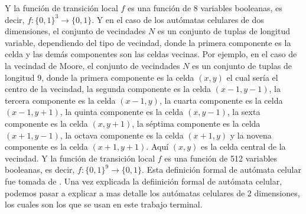         Y la funci\'on de transici\'on local $f$ es una funci\'on de 8 variables booleanas, es decir, $f: \{0,1\}^3 \rightarrow \{0,1\}$.
    \vskip 0.5cm    
    Y en el caso de los aut\'omatas celulares de dos dimensiones, el conjunto de vecindades $N$ es un conjunto de tuplas de longitud variable, 
        dependiendo del tipo de vecindad, donde la primera componente es la celda y las dem\'as componentes son las celdas vecinas. Por ejemplo, 
        en el caso de la vecindad de Moore, el conjunto de vecindades $N$ es un conjunto de tuplas de longitud 9, donde la primera componente es la celda
        $(x,y)$ el cual ser\'ia el centro de la vecindad, la segunda componente es la celda $(x-1,y-1)$, la tercera componente es la celda $(x-1,y)$,
        la cuarta componente es la celda $(x-1,y+1)$, la quinta componente es la celda $(x,y-1)$, la sexta componente es la celda $(x,y+1)$, la s\'eptima
        componente es la celda $(x+1,y-1)$, la octava componente es la celda $(x+1,y)$ y la novena componente es la celda $(x+1,y+1)$. Aqu\'i 
        $(x,y)$ es la celda central de la vecindad. Y la funci\'on de transici\'on local $f$ es una funci\'on de 512 variables booleanas, es decir,
        $f: \{0,1\}^{9} \rightarrow \{0,1\}$.
    \vskip 0.5cm
    Esta definici\'on formal de aut\'omata celular fue tomada de \cite{Codd1968}. Una vez explicada la defiinici\'on formal de aut\'omata celular,
        podemos pasar a explicar a mas detalle los aut\'omatas celulares de 2 dimensiones, los cuales son los que se usan en este trabajo terminal.
    \vskip 0.5cm